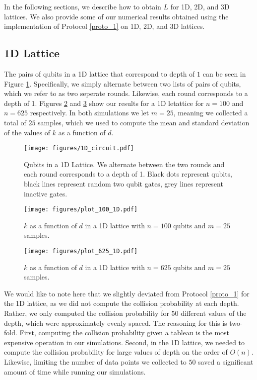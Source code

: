 \message{ !name(report_1.tex)}\documentclass[11pt]{article}
\theoremstyle{definition}
\theoremstyle{plain}
\begin{document}
In the following sections, we describe how to obtain $L$ for 1D, 2D, and 3D lattices. We also provide some of our numerical results obtained using the implementation of Protocol {\ref{proto_1}} on 1D, 2D, and 3D lattices.

\subsection{1D Lattice}
The pairs of qubits in a 1D lattice that correspond to depth of $1$ can be seen in Figure {\ref{fig_1d}}. Specifically, we simply alternate between two lists of pairs of qubits, which we refer to as two seperate rounds. Likewise, each round corresponds to a depth of 1. Figures {\ref{plot_1d_1}} and {\ref{plot_1d_2}} show our results for a 1D letattice for $n = 100$ and $n = 625$ respectively. In both simulations we let $m = 25$, meaning we collected a total of $25$ samples, which we used to compute the mean and standard deviation of the values of $k$ as a function of $d$.

\begin{figure}[!htp]
\centering
\texttt{[image: figures/1D\_circuit.pdf]}
\caption{Qubits in a 1D Lattice. We alternate between the two rounds and each round corresponds to a depth of 1. Black dots represent qubits, black lines represent random two qubit gates, grey lines represent inactive gates. }
\label{fig_1d}
\end{figure}
\begin{figure}[!htp]
\centering
\texttt{[image: figures/plot\_100\_1D.pdf]}
\caption{$k$ as a function of $d$ in a 1D lattice with $n = 100$ qubits and $m = 25$ samples.}
\label{plot_1d_1}
\end{figure}
\begin{figure}[!htp]
\centering
\texttt{[image: figures/plot\_625\_1D.pdf]}
\caption{$k$ as a function of $d$ in a 1D lattice with $n = 625$ qubits and $m =25$ samples.}
\label{plot_1d_2} 
\end{figure}

We would like to note here that we slightly deviated from Protocol {\ref{proto_1}} for the 1D lattice, as we did not compute the collision probability at each depth. Rather, we only computed the collision probability for 50 different values of the depth, which were approximately evenly spaced. The reasoning for this is two-fold. First, computing the collision probability given a tableau is the most expensive operation in our simulations. Second, in the 1D lattice, we needed to compute the collision probability for large values of depth on the order of $O(n)$. Likewise, limiting the number of data points we collected to $50$ saved a significant amount of time while running our simulations.
\end{document}
